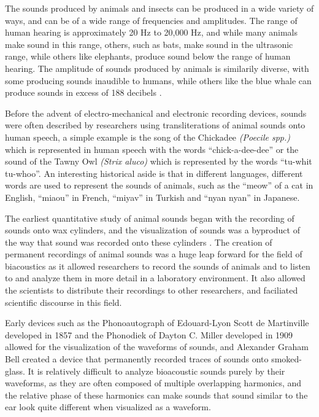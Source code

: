 \documentclass[12pt,oneside]{book}
\begin{document}
The sounds produced by animals and insects can be produced in a wide
variety of ways, and can be of a wide range of frequencies and
amplitudes.  The range of human hearing is approximately 20 Hz to
20,000 Hz, \cite{} and while many animals make sound in this range,
others, such as bats, make sound in the ultrasonic range, while others
like elephants, produce sound below the range of human hearing.  The
amplitude of sounds produced by animals is similarily diverse, with
some producing sounds inaudible to humans, while others like the blue
whale can produce sounds in excess of 188 decibels \cite{}.

Before the advent of electro-mechanical and electronic recording
devices, sounds were often described by researchers using
transliterations of animal sounds onto human speech, a simple example
is the song of the Chickadee \textit{(Poecile spp.)} which is
represented in human speech with the words ``chick-a-dee-dee'' or the
sound of the Tawny Owl \textit{(Strix aluco)} which is represented by
the words ``tu-whit tu-whoo''.  An interesting historical aside is
that in different languages, different words are used to represent the
sounds of animals, such as the ``meow'' of a cat in English, ``miaou''
in French, ``miyav'' in Turkish and ``nyan nyan'' in Japanese.

The earliest quantitative study of animal sounds began with the
recording of sounds onto wax cylinders, and the visualization of
sounds was a byproduct of the way that sound was recorded onto these
cylinders \cite{}.  The creation of permanent recordings of animal
sounds was a huge leap forward for the field of biacoustics as it
allowed researchers to record the sounds of animals and to listen to
and analyze them in more detail in a laboratory environment.  It also
allowed the scientists to distribute their recordings to other
researchers, and faciliated scientific discourse in this field.

Early devices such as the Phonoautograph of Edouard-Lyon Scott de
Martinville developed in 1857 and the Phonodiek of Dayton C. Miller
developed in 1909 allowed for the visualization of the waveforms of
sounds, and Alexander Graham Bell created a device that permanently
recorded traces of sounds onto smoked-glass.  It is relatively
difficult to analyze bioacoustic sounds purely by their waveforms, as
they are often composed of multiple overlapping harmonics, and the
relative phase of these harmonics can make sounds that sound similar
to the ear look quite different when visualized as a waveform.
\end{document}
